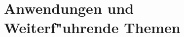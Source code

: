 \documentclass{book}
\begin{document}
			\part{Anwendungen und Weiterf"uhrende Themen}
			
			\def\chapterauthor#1{{\large #1}\bigskip\bigskip}
			
			
			
			
			
			
			
			
			\vfill
			\pagebreak
			\ifodd\value{page}\else\null\clearpage\fi
			\rhead{}
			
			
		
\end{document}
